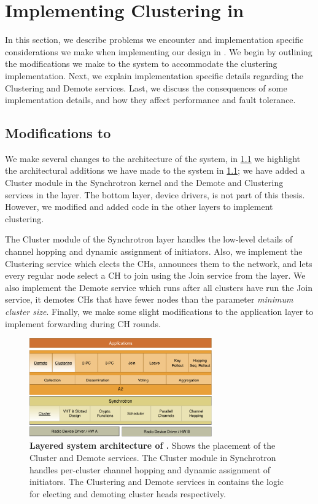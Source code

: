 \chapter{Implementing Clustering in \atwo{}}
\label{chap:implementation}
In this section, we describe problems we encounter and implementation specific considerations we make when implementing our design in \atwo{}. We begin by outlining the modifications we make to the \atwo{} system to accommodate the clustering implementation. Next, we explain implementation specific details regarding the Clustering and Demote services. Last, we discuss the consequences of some implementation details, and how they affect performance and fault tolerance. 

\section{Modifications to \atwo{}}
We make several changes to the architecture of the \atwo{} system, in \cref{fig:a2-architecture} we highlight the architectural additions we have made to the \atwo{} system in \cref{fig:a2-architecture}; we have added a Cluster module in the Synchrotron kernel and the Demote and Clustering services in the \atwo{} layer. The bottom layer, device drivers, is not part of this thesis. However, we modified and added code in the other layers to implement clustering.

The Cluster module of the Synchrotron layer handles the low-level details of channel hopping and dynamic assignment of initiators. Also, we implement the Clustering service which elects the CHs, announces them to the network, and lets every regular node select a CH to join using the Join service from the \atwo{} layer. We also implement the Demote service which runs after all clusters have run the Join service, it demotes CHs that have fewer nodes than the parameter \emph{minimum cluster size}. Finally, we make some slight modifications to the application layer to implement forwarding during CH rounds.

\begin{figure}[bt]
    \centering
    \includegraphics[width=0.7\textwidth]{figure/architecture.pdf}
    \caption{\textbf{Layered system architecture of \atwo{} \cite{a2-introduction-paper}.} Shows the placement of the Cluster and Demote services. The Cluster module in Synchrotron handles per-cluster channel hopping and dynamic assignment of initiators. The Clustering and Demote services in \atwo{} contains the logic for electing and demoting cluster heads respectively.}
    \label{fig:a2-architecture}
\end{figure}


